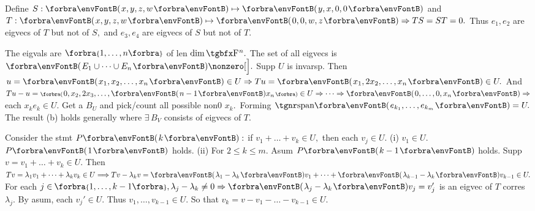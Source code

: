 \SepLine

Define $S:\Par{x,y,z,w}\mapsto\Par{y,x,0,0}$ and $T:\Par{x,y,z,w}\mapsto\Par{0,0,w,z}\Rightarrow TS=ST=0.$\parSol{}
Thus ${e_1,e_2}$ are eigvecs of $T$ but not of $S,$ and ${e_3,e_4}$ are eigvecs of $S$ but not of $T.$
\SepLine


The eigvals are $\Bra{1,\dots,n}$ of len $\dim\FbbP{n}.$ The set of all eigvecs is $\Par{E_1\cup\cdots\cup E_n}\nonzero[\Big].$\parSol{}
Supp $U$ is invarsp. Then $u=\Par{x_1,x_2,\dots,x_n}\in U\Rightarrow Tu=\Par{x_1,2x_2,\dots,x_n}\in U.$\parSol{}
And $Tu-u=\BigPar{0,x_2,2x_3,\dots,\Par{n-1}x_n}\in U\Rightarrow\cdots\Rightarrow\Par{0,\dots,0,x_n}\Rightarrow$ each $x_ke_k\in U.$\parSol{}
Get a $B_U$ and pick/count all possible non0 $x_k.$ \,Forming $\Span{e_{k_1},\dots,e_{k_m}}=U.$\PfEnd\vspace{2pt}
\AComm The result (b) holds generally where $\exists\,B_V$ consists of eigvecs of $T.$
\SepLine

Consider the stmt $P\Par{k}:$ if $v_1+\dots+v_k\in U,$ then each $v_j\in U.$\parSol{}
(i) $v_1\in U.$ $P\Par{1}$ holds. (ii) For $2\leqslant k\leqslant m.$ Asum $P\Par{k-1}$ holds. Supp $v=v_1+\dots+v_k\in U.$\parSol{}
Then $Tv=\lambda_1v_1+\dots+\lambda_k v_k\in U\Longrightarrow Tv-\lambda_k v=\Par{\lambda_1-\lambda_k}v_1+\dots+\Par{\lambda_{k-1}-\lambda_k}v_{k-1}\in U.$\parSol{}
For each $j\in\;\!\!\Bra{1,\dots,k-1},\lambda_j-\lambda_{k}\neq 0\Rightarrow\Par{\lambda_j-\lambda_k}v_j=v_j'$ is an eigvec of $T$ corres $\lambda_j.$\parSol{}
By asum, each $v_j'\in U.$ Thus $v_1,\dots,v_{k-1}\in U.$ So that $v_k=v-v_1-\dots-v_{k-1}\in U.$\PfEnd
\SepLine[0pt][\Blind{\BulletPointX} ]

